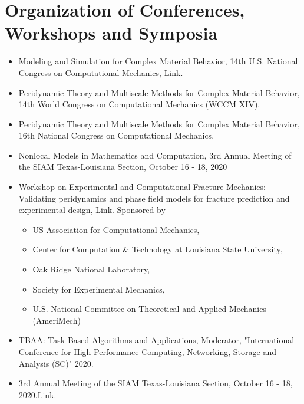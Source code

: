 \documentclass[11pt,a4paper,sans]{moderncv}
\begin{document}
\section{Organization of Conferences, Workshops and Symposia}
\begin{itemize}[leftmargin=4cm]
\item Modeling and Simulation for Complex Material Behavior, 14th U.S. National Congress on Computational Mechanics, \href{http://14.usnccm.org/MS402}{Link}.
\item Peridynamic Theory and Multiscale Methods for Complex Material Behavior, 14th World Congress on Computational Mechanics (WCCM XIV).
\item Peridynamic Theory and Multiscale Methods for Complex Material Behavior, 16th National Congress on Computational Mechanics. 
\item Nonlocal Models in Mathematics and Computation, 3rd Annual Meeting of the SIAM Texas-Louisiana Section, October 16 - 18, 2020 
\end{itemize}
\begin{itemize}[leftmargin=4cm]
\item Workshop on Experimental and Computational Fracture Mechanics:  Validating peridynamics and phase field models for fracture
prediction and experimental design, \href{http://wfm2020.usacm.org/}{Link}. Sponsored by
\begin{itemize}
\item US Association for Computational Mechanics,
\item Center for Computation \& Technology at Louisiana State University, 
\item Oak Ridge National Laboratory,
\item Society for Experimental Mechanics,
\item U.S. National Committee on Theoretical and Applied Mechanics (AmeriMech)
\end{itemize}
\end{itemize}

\begin{itemize}[leftmargin=4cm]
\item TBAA: Task-Based Algorithms and Applications, Moderator, "International Conference for High Performance Computing, Networking, Storage and Analysis (SC)" 2020. 
\end{itemize}


\begin{itemize}[leftmargin=4cm]
\item 3rd Annual Meeting of the SIAM Texas-Louisiana Section, October 16 - 18, 2020.\href{https://www.math.tamu.edu/conferences/SIAMTXLA/}{Link}.
\end{itemize}
\end{document}
